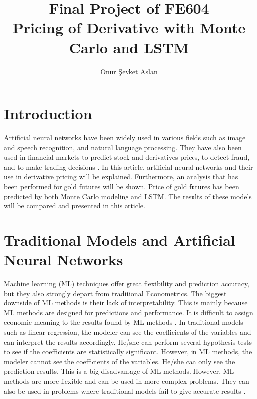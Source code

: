 \documentclass[12pt, a4paper]{article}
\title{Final Project of FE604 \\ Pricing of Derivative with Monte Carlo and LSTM}
\author{Onur Şevket Aslan}
\begin{document}
\maketitle

\newpage
\tableofcontents

\newpage
\section{Introduction}
Artificial neural networks have been widely used in various fields such as image and speech recognition, and natural language processing.  They have also been used in financial markets to predict stock and derivatives prices, to detect fraud, and to make trading decisions \cite{4}.  In this article, artificial neural networks and their use in derivative pricing will be explained.  Furthermore, an analysis that has been performed for gold futures will be shown.  Price of gold futures has been predicted by both Monte Carlo modeling and LSTM.  The results of these models will be compared and presented in this article.\\[\baselineskip]


\section{Traditional Models and Artificial Neural Networks}
Machine learning (ML) techniques offer great flexibility and prediction accuracy, but they also strongly depart from traditional Econometrics.  The biggest downside of ML methods is their lack of interpretability.  This is mainly because ML methods are designed for predictions and performance.  It is difficult to assign economic meaning to the results found by ML methods \cite{3}.  In traditional models such as linear regression, the modeler can see the coefficients of the variables and can interpret the results accordingly.  He/she can perform several hypothesis tests to see if the coefficients are statistically significant.  However, in ML methods, the modeler cannot see the coefficients of the variables.  He/she can only see the prediction results.  This is a big disadvantage of ML methods.  However, ML methods are more flexible and can be used in more complex problems.  They can also be used in problems where traditional models fail to give accurate results \cite{3}.\\
\end{document}
